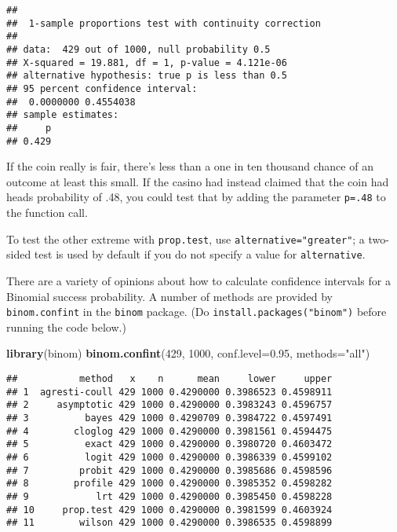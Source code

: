 \documentclass[]{book}
\newenvironment{Shaded}{\begin{snugshade}}{\end{snugshade}}
\newcommand{\DataTypeTok}[1]{\textcolor[rgb]{0.13,0.29,0.53}{#1}}
\newcommand{\DecValTok}[1]{\textcolor[rgb]{0.00,0.00,0.81}{#1}}
\newcommand{\FloatTok}[1]{\textcolor[rgb]{0.00,0.00,0.81}{#1}}
\newcommand{\KeywordTok}[1]{\textcolor[rgb]{0.13,0.29,0.53}{\textbf{#1}}}
\newcommand{\NormalTok}[1]{#1}
\newcommand{\StringTok}[1]{\textcolor[rgb]{0.31,0.60,0.02}{#1}}
\theoremstyle{definition}
\theoremstyle{definition}
\theoremstyle{definition}
\theoremstyle{remark}
\begin{document}
\begin{verbatim}
## 
##  1-sample proportions test with continuity correction
## 
## data:  429 out of 1000, null probability 0.5
## X-squared = 19.881, df = 1, p-value = 4.121e-06
## alternative hypothesis: true p is less than 0.5
## 95 percent confidence interval:
##  0.0000000 0.4554038
## sample estimates:
##     p 
## 0.429
\end{verbatim}

If the coin really is fair, there's less than a one in ten thousand
chance of an outcome at least this small. If the casino had instead
claimed that the coin had heads probability of .48, you could test that
by adding the parameter \texttt{p=.48} to the function call.

To test the other extreme with \texttt{prop.test}, use
\texttt{alternative="greater"}; a two-sided test is used by default if
you do not specify a value for \texttt{alternative}.

There are a variety of opinions about how to calculate confidence
intervals for a Binomial success probability. A number of methods are
provided by \texttt{binom.confint} in the \texttt{binom} package. (Do
\texttt{install.packages("binom")} before running the code below.)

\begin{Shaded}
\begin{Highlighting}[]
\KeywordTok{library}\NormalTok{(binom)}
\KeywordTok{binom.confint}\NormalTok{(}\DecValTok{429}\NormalTok{, }\DecValTok{1000}\NormalTok{, }\DataTypeTok{conf.level=}\FloatTok{0.95}\NormalTok{, }\DataTypeTok{methods=}\StringTok{"all"}\NormalTok{)}
\end{Highlighting}
\end{Shaded}

\begin{verbatim}
##           method   x    n      mean     lower     upper
## 1  agresti-coull 429 1000 0.4290000 0.3986523 0.4598911
## 2     asymptotic 429 1000 0.4290000 0.3983243 0.4596757
## 3          bayes 429 1000 0.4290709 0.3984722 0.4597491
## 4        cloglog 429 1000 0.4290000 0.3981561 0.4594475
## 5          exact 429 1000 0.4290000 0.3980720 0.4603472
## 6          logit 429 1000 0.4290000 0.3986339 0.4599102
## 7         probit 429 1000 0.4290000 0.3985686 0.4598596
## 8        profile 429 1000 0.4290000 0.3985352 0.4598282
## 9            lrt 429 1000 0.4290000 0.3985450 0.4598228
## 10     prop.test 429 1000 0.4290000 0.3981599 0.4603924
## 11        wilson 429 1000 0.4290000 0.3986535 0.4598899
\end{verbatim}
\end{document}
